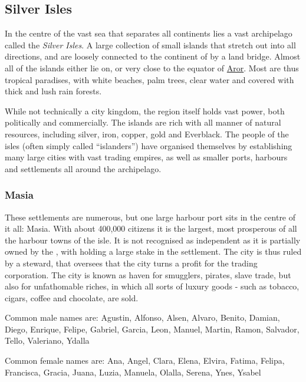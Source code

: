 \subsection{Silver Isles}
\label{sec:Silver Isles}

In the centre of the vast sea that separates all continents lies a vast
archipelago called the \emph{Silver Isles}. A large collection of small
islands that stretch out into all directions, and are loosely connected to the
continent of  by a land bridge. Almost all of the islands
either lie on, or very close to the equator of \hyperref[sec:Aror]{Aror}. Most
are thus tropical paradises, with white beaches, palm trees, clear water and
covered with thick and lush rain forests.

While not technically a city kingdom, the region itself holds vast power,
both politically and commercially. The islands are rich with all manner of
natural resources, including silver, iron, copper, gold and Everblack. The
people of the isles (often simply called ``islanders'') have organised
themselves by establishing many large cities with vast trading empires,
as well as smaller ports, harbours and settlements all around the archipelago.

\subsubsection{Masia}
\label{sec:Masia}

These settlements are numerous, but one large harbour port sits in the centre
of it all: Masia. With about 400,000 citizens it is the largest, most
prosperous of all the harbour towns of the isle. It is not recognised as
independent as it is partially owned by the , with  holding a large stake in the
settlement. The city is thus ruled by a steward, that oversees that the city
turns a profit for the trading corporation. The city is known as haven for
smugglers, pirates, slave trade, but also for unfathomable riches, in which
all sorts of luxury goods - such as tobacco, cigars, coffee and chocolate, are
sold.

Common male names are: Agustin, Alfonso, Alsen, Alvaro, Benito, Damian, Diego,
Enrique, Felipe, Gabriel, Garcia, Leon, Manuel, Martin, Ramon, Salvador, Tello,
Valeriano, Ydalla

Common female names are: Ana, Angel, Clara, Elena, Elvira, Fatima, Felipa,
Francisca, Gracia, Juana, Luzia, Manuela, Olalla, Serena, Ynes, Ysabel

